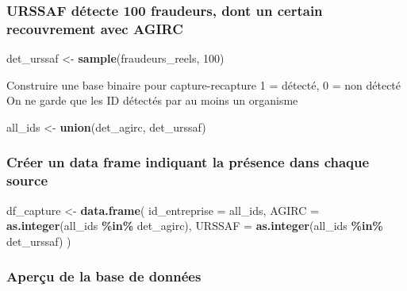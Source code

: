 \documentclass[
]{article}
\newenvironment{Shaded}{\begin{snugshade}}{\end{snugshade}}
\newcommand{\AttributeTok}[1]{\textcolor[rgb]{0.13,0.29,0.53}{#1}}
\newcommand{\DecValTok}[1]{\textcolor[rgb]{0.00,0.00,0.81}{#1}}
\newcommand{\FunctionTok}[1]{\textcolor[rgb]{0.13,0.29,0.53}{\textbf{#1}}}
\newcommand{\NormalTok}[1]{#1}
\newcommand{\OtherTok}[1]{\textcolor[rgb]{0.56,0.35,0.01}{#1}}
\newcommand{\SpecialCharTok}[1]{\textcolor[rgb]{0.81,0.36,0.00}{\textbf{#1}}}
\begin{document}
\subsubsection{URSSAF détecte 100 fraudeurs, dont un certain
recouvrement avec
AGIRC}\label{urssaf-duxe9tecte-100-fraudeurs-dont-un-certain-recouvrement-avec-agirc}

\begin{Shaded}
\begin{Highlighting}[]
\NormalTok{det\_urssaf }\OtherTok{\textless{}{-}} \FunctionTok{sample}\NormalTok{(fraudeurs\_reels, }\DecValTok{100}\NormalTok{)}
\end{Highlighting}
\end{Shaded}

Construire une base binaire pour capture-recapture 1 = détecté, 0 = non
détecté On ne garde que les ID détectés par au moins un organisme

\begin{Shaded}
\begin{Highlighting}[]
\NormalTok{all\_ids }\OtherTok{\textless{}{-}} \FunctionTok{union}\NormalTok{(det\_agirc, det\_urssaf)}
\end{Highlighting}
\end{Shaded}

\subsubsection{Créer un data frame indiquant la présence dans chaque
source}\label{cruxe9er-un-data-frame-indiquant-la-pruxe9sence-dans-chaque-source}

\begin{Shaded}
\begin{Highlighting}[]
\NormalTok{df\_capture }\OtherTok{\textless{}{-}} \FunctionTok{data.frame}\NormalTok{(}
  \AttributeTok{id\_entreprise =}\NormalTok{ all\_ids,}
  \AttributeTok{AGIRC =} \FunctionTok{as.integer}\NormalTok{(all\_ids }\SpecialCharTok{\%in\%}\NormalTok{ det\_agirc),}
  \AttributeTok{URSSAF =} \FunctionTok{as.integer}\NormalTok{(all\_ids }\SpecialCharTok{\%in\%}\NormalTok{ det\_urssaf)}
\NormalTok{)}
\end{Highlighting}
\end{Shaded}

\subsubsection{Aperçu de la base de
données}\label{aperuxe7u-de-la-base-de-donnuxe9es}
\end{document}
